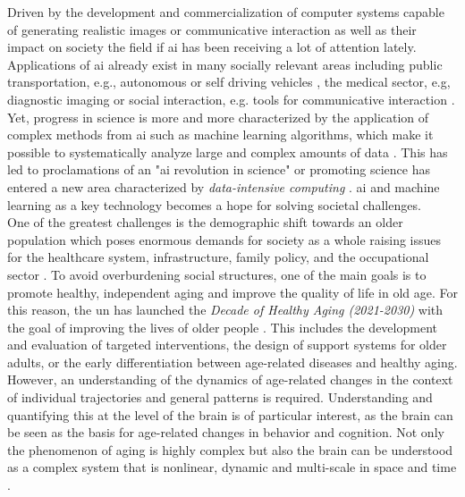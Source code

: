 
Driven by the development and commercialization of computer systems capable of generating realistic images or communicative interaction as well as their impact on society \cite{lin2023} the field if \gls{ai} has been receiving a lot of attention lately. Applications of \gls{ai} already exist in many socially relevant areas including public transportation, e.g., autonomous or self driving vehicles \cite{Leonard2020}, the medical sector, e.g, diagnostic imaging \cite{Liu2020} or social interaction, e.g. tools for communicative interaction \cite{Adamopoulou2020}. Yet, progress in science is more and more characterized by the application of complex methods from \gls{ai} such as machine learning algorithms, which make it possible to systematically analyze large and complex amounts of data \cite{Brunton2019}. This has led to proclamations of an "\gls{ai} revolution in science" \cite{Appenzeller2017} or promoting science has entered a new area characterized by \textit{data-intensive computing} \cite{Hey2009}. \Gls{ai} and machine learning as a key technology becomes a hope for solving societal challenges.\\
One of the greatest challenges is the demographic shift towards an older population which poses enormous demands for society as a whole raising issues for the healthcare system, infrastructure, family policy, and the occupational sector \cite{who_aging2023}. To avoid overburdening social structures, one of the main goals is to promote healthy, independent aging and improve the quality of life in old age. For this reason, the \gls{un} has launched the \textit{Decade of Healthy Aging (2021-2030)} with the goal of improving the lives of older people \cite{who_decade_ha2020}. This includes the development and evaluation of targeted interventions, the design of support systems for older adults, or the early differentiation between age-related diseases and healthy aging. However, an understanding of the dynamics of age-related changes in the context of individual trajectories and general patterns is required. Understanding and quantifying this at the level of the brain is of particular interest, as the brain can be seen as the basis for age-related changes in behavior and cognition. Not only the phenomenon of aging is highly complex but also the brain can be understood as a complex system that is nonlinear, dynamic and multi-scale in space and time \cite{Betzel2017}.\\ 
